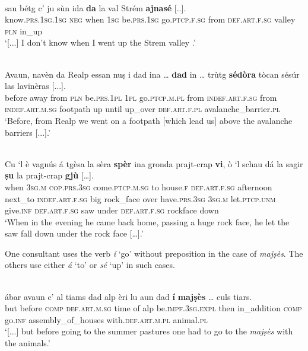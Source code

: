 \ea
\label{}
\\
\gll  [...] sau bétg c’ ju sùn ida \textbf{da} la val Strém \textbf{ajnasé} [..].\\
{} know.\textsc{prs.1sg.1sg} \textsc{neg} when \textsc{1sg} be.\textsc{prs.1sg} go.\textsc{ptcp.f.sg} from \textsc{def.art.f.sg} valley \textsc{pln} in\_up\\
\glt `[...] I don’t know when I went up the Strem valley {}.'
\z

\ea
\label{}
\\
\gll  Avaun, navèn da Realp essan nuṣ i dad ina … \textbf{dad} in … trùtg \textbf{sédòra} tòcan sésúr las lavinèras [...]. \\
before away from \textsc{pln} be.\textsc{prs.1pl} \textsc{1pl} go.\textsc{ptcp.m.pl} from \textsc{indef.art.f.sg} {} from \textsc{indef.art.m.sg} {} footpath up until up\_over \textsc{def.art.f.pl} avalanche\_barrier.\textsc{pl} \\
\glt `Before, from Realp we went on a footpath [which lead us] above the avalanche barriers [...].'
\z

\ea
\label{}
\\
\gll Cu ‘l è vagnús á tgèsa la sèra \textbf{spèr} ina gronda prajt-crap \textbf{vi}, ò ‘l schau dá la sagir \textbf{ṣu} la prajt-crap \textbf{gjù} […].\\ 
when \textsc{3sg.m} \textsc{cop.prs.3sg} come.\textsc{ptcp.m.sg} to house.\textsc{f} \textsc{def.art.f.sg} afternoon next\_to \textsc{indef.art.f.sg} big rock\_face over have.\textsc{prs.3sg} \textsc{3sg.m} let.\textsc{ptcp.unm} give.\textsc{inf} \textsc{def.art.f.sg} saw under \textsc{def.art.f.sg} rock\-face down\\
\glt `When in the evening he came back home, passing a huge rock face, he let the saw fall down under the rock face […].'
\z

One consultant uses the verb \textit{í} `go' without preposition in the case of \textit{majṣès}. The others use either \textit{á} `to' or \textit{sé} `up' in such cases.

\ea
\label{}
\\
	\gll  [...] ábar avaun c’ al tiams dad alp èri lu aun dad \textbf{í} \textbf{majṣès} … culs tiars.  \\
{} but before \textsc{comp} \textsc{def.art.m.sg} time of alp be.\textsc{impf.3sg.expl} then in\_addition \textsc{comp} go.\textsc{inf} assembly\_of\_houses {} with.\textsc{def.art.m.pl} animal.\textsc{pl}\\
\glt `[...] but before going to the summer pastures one had to go to the \textit{majṣès} with the animals.'
\z

